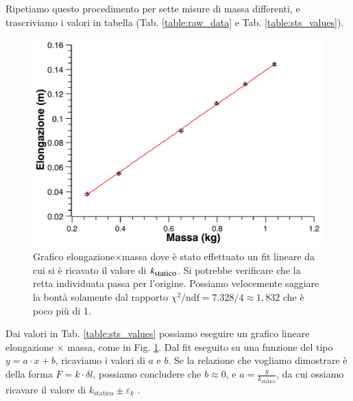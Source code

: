 \documentclass[italian, a4paper, 10pt, twocolumn]{../../style/lab_unige}
\newcommand{\reftab}[1]{Tab. {\ref{#1}}}%
\newcommand{\reffig}[1]{Fig. {\ref{#1}}}%
\newcommand{\ks}{$k_{\text{\small statico}}$\space}
\newcommand{\ChiNdf}{$\chi^2/\text{ndf}$\space}
\newcommand{\hookeLaw}{$F=k\cdot\delta l$\space}
\newcommand{\misuraIncertezaUM}[3]{$#1\pm#2$ #3}
\begin{document}
    Ripetiamo questo procedimento per sette misure di massa differenti, e trascriviamo i valori in tabella 
    (\reftab{table:raw_data} e \reftab{table:sts_values}).\\ %

    \begin{figure}
        \centering
        \includegraphics[width=\linewidth]{plot_sts.pdf}
        \caption{Grafico elongazione$\times$massa dove è stato effettuato un fit lineare da cui si è ricavato il 
        valore di \ks. Si potrebbe verificare che la retta individuata passa per l'origine. Possiamo velocemente 
        saggiare la bontà solamente dal rapporto \ChiNdf$=7.328/4\approx1,832$ che è poco più di 1.}
        \label{figure:plot_sts}
    \end{figure}

    Dai valori in \reftab{table:sts_values} possiamo eseguire un grafico lineare elongazione $\times$ massa, come
    in \reffig{figure:plot_sts}. 
    Dal fit eseguito su una funzione del tipo $y=a\cdot x + b$, ricaviamo i valori di $a$ e $b$. Se la relazione 
    che vogliamo dimostrare è della forma \hookeLaw, possiamo concludere che $b\approx0$, e
    $a=\frac{g}{k_{\text{statico}}}$, da cui ossiamo ricavare il valore di 
    \misuraIncertezaUM{k_{\text{statico}}}{\varepsilon_k}{}.

    
\end{document}
